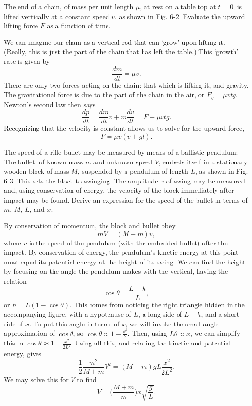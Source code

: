 \documentclass[../feynman-lectures-on-physics.tex]{subfiles}
\begin{document}
\begin{questions}
	\question The end of a chain, of mass per unit length $\mu$, at rest on a table top at $t = 0$, is lifted vertically at a constant speed $v$, as shown in Fig. 6-2. Evaluate the upward lifting force $F$ as a function of time.

	\begin{solution}
		We can imagine our chain as a vertical rod that can `grow' upon lifting it. (Really, this is just the part of the chain that has left the table.) This `growth' rate is given by
		\[
			\frac{dm}{dt} = \mu{v}
		.\] 
		There are only two forces acting on the chain: that which is lifting it, and gravity. The gravitational force is due to the part of the chain in the air, or $F_g = \mu{v}tg$. Newton's second law then says
		\[
			\frac{dp}{dt} = \frac{dm}{dt}v + m\frac{dv}{dt} = F - \mu{v}tg
		.\] 
		Recognizing that the velocity is constant allows us to solve for the upward force,
		\[
			F = \mu{v}(v + gt)
		.\]
	\end{solution}

	\question The speed of a rifle bullet may be measured by means of a ballistic pendulum: The bullet, of known mass $m$ and unknown speed $V$, embeds itself in a stationary wooden block of mass $M$, suspended by a pendulum of length $L$, as shown in Fig. 6-3. This sets the block to swinging. The amplitude $x$ of swing may be measured and, using conservation of energy, the velocity of the block immediately after impact may be found. Derive an expression for the speed of the bullet in terms of $m$, $M$, $L$, and $x$.

	\begin{solution}
		By conservation of momentum, the block and bullet obey
		\[
			mV = (M+m)v
		,\] 
		where $v$ is the speed of the pendulum (with the embedded bullet) after the impact. By conservation of energy, the pendulum's kinetic energy at this point must equal its potential energy at the height of its swing. We can find the height by focusing on the angle the pendulum makes with the vertical, having the relation
		\[
			\cos\theta = \frac{L-h}{L}
		,\] 
		or $h = L(1 - \cos\theta)$. This comes from noticing the right triangle hidden in the accompanying figure, with a hypotenuse of $L$, a long side of $L - h$, and a short side of $x$. To put this angle in terms of $x$, we will invoke the small angle approximation of $\cos\theta$, so $\cos\theta \approx 1 - \frac{\theta^2}{2}$. Then, using $L\theta \approx {x}$, we can simplify this to $\cos\theta \approx 1 - \frac{x^2}{2L^2}$. Using all this, and relating the kinetic and potential energy, gives
		\[
			\frac{1}{2}\frac{m^2}{M+m}V^2 = (M+m)gL\frac{x^2}{2L^2}
		.\] 
		We may solve this for $V$ to find
		\[
			V = \Big(\frac{M+m}{m}\Big)x\sqrt{\frac{g}{L}}	
		.\] 
	\end{solution}


\end{questions}
\end{document}
